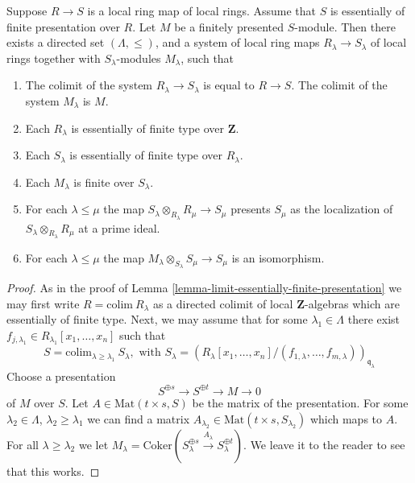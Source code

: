 \begin{lemma}
\label{lemma-limit-module-essentially-finite-presentation}
Suppose $R \to S$ is a local ring map of local rings.
Assume that $S$ is essentially of finite presentation over $R$.
Let $M$ be a finitely presented $S$-module.
Then there exists a directed set $(\Lambda, \leq)$, and
a system of local ring maps $R_\lambda \to S_\lambda$
of local rings together with $S_\lambda$-modules $M_\lambda$,
such that
\begin{enumerate}
\item The colimit of the system $R_\lambda \to S_\lambda$
is equal to $R \to S$. The colimit of the system $M_\lambda$
is $M$.
\item Each $R_\lambda$ is essentially of finite type
over $\mathbf{Z}$.
\item Each $S_\lambda$ is essentially of finite type
over $R_\lambda$.
\item Each $M_\lambda$ is finite over $S_\lambda$.
\item For each $\lambda \leq \mu$ the map
$S_\lambda \otimes_{R_\lambda} R_\mu \to S_\mu$
presents $S_\mu$ as the localization of
$S_\lambda \otimes_{R_\lambda} R_\mu$
at a prime ideal.
\item For each $\lambda \leq \mu$ the map
$M_\lambda \otimes_{S_\lambda} S_\mu \to S_\mu$
is an isomorphism.
\end{enumerate}
\end{lemma}

\begin{proof}
As in the proof of Lemma \ref{lemma-limit-essentially-finite-presentation}
we may first write $R = \text{colim}\ R_\lambda$ as a directed colimit
of local $\mathbf{Z}$-algebras which are essentially of finite type.
Next, we may assume that for some $\lambda_1 \in \Lambda$ there
exist $f_{j, \lambda_1} \in R_{\lambda_1}[x_1, \ldots, x_n]$
such that
$$
S =
\text{colim}_{\lambda \geq \lambda_1}\ S_\lambda, \text{ with }
S_\lambda =
(R_\lambda[x_1, \ldots, x_n]/
(f_{1, \lambda}, \ldots, f_{m, \lambda}))_{\mathfrak q_\lambda}
$$
Choose a presentation
$$
S^{\oplus s} \to S^{\oplus t} \to M \to 0
$$
of $M$ over $S$. Let $A \in \text{Mat}(t\times s, S)$ be
the matrix of the presentation. For some $\lambda_2 \in \Lambda$,
$\lambda_2 \geq \lambda_1$
we can find a matrix $A_{\lambda_2} \in \text{Mat}(t\times s, S_{\lambda_2})$
which maps to $A$. For all $\lambda \geq \lambda_2$ we let
$M_\lambda = \text{Coker}(S_\lambda^{\oplus s} \xrightarrow{A_\lambda}
S_\lambda^{\oplus t})$. We leave it to the reader to see that
this works.
\end{proof}

